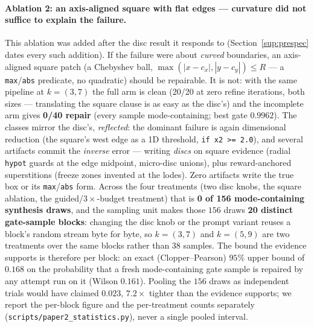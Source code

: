 \documentclass[11pt]{article}
\theoremstyle{definition}
\theoremstyle{remark}
\begin{document}
\paragraph{Ablation 2: an axis-aligned square with flat edges --- curvature did not suffice to explain the failure.} This ablation was added after the disc result it responds to (Section~\ref{sup:prespec} dates every such addition). If the failure were about \emph{curved} boundaries, an axis-aligned square patch (a Chebyshev ball, $\max(|x-c_x|,|y-c_y|) \le R$ --- a \texttt{max}/\texttt{abs} predicate, no quadratic) should be repairable. It is not: with the same pipeline at $k=(3,7)$ the full arm is clean (20/20 at zero refine iterations, both sizes --- translating the square clause is as easy as the disc's) and the incomplete arm gives \textbf{0/40 repair} (every sample mode-containing; best gate $0.9962$). The classes mirror the disc's, \emph{reflected}: the dominant failure is again dimensional reduction (the square's west edge as a 1D threshold, \texttt{if x2 >= 2.0}), and several artifacts commit the \emph{inverse} error --- writing \emph{discs} on square evidence (radial \texttt{hypot} guards at the edge midpoint, micro-disc unions), plus reward-anchored superstitions (freeze zones invented at the lodes). Zero artifacts write the true box or its \texttt{max}/\texttt{abs} form. Across the four treatments (two disc knobs, the square ablation, the guided/$3\times$-budget treatment) that is \textbf{0 of 156 mode-containing synthesis draws}, and the sampling unit makes those $156$ draws \textbf{20 distinct gate-sample blocks}: changing the disc knob or the prompt variant reuses a block's random stream byte for byte, so $k=(3,7)$ and $k=(5,9)$ are two treatments over the same blocks rather than $38$ samples. The bound the evidence supports is therefore per block: an exact (Clopper--Pearson) $95\%$ upper bound of $\mathbf{0.168}$ on the probability that a fresh mode-containing gate sample is repaired by any attempt run on it (Wilson $0.161$). Pooling the $156$ draws as independent trials would have claimed $0.023$, $7.2\times$ tighter than the evidence supports; we report the per-block figure and the per-treatment counts separately (\texttt{scripts/\allowbreak paper2\_\allowbreak statistics.py}), never a single pooled interval.
\end{document}
